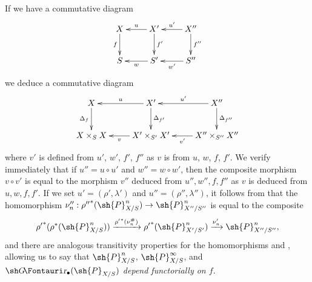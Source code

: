 \begin{env}[16.4.2]
\label{IV.16.4.2}
If we have a commutative diagram
\[
  \xymatrix{
    X \ar[d]_-{f} & X' \ar[l]_-u \ar[d]^-{f'} & X'' \ar[l]_-{u'} \ar[d]^-{f''}\\
    S & S' \ar[l]^-w & S'' \ar[l]^-{w'} 
  }
\]
we deduce a commutative diagram
\[
  \xymatrix{
    X \ar[d]_-{\Delta_f} & X' \ar[l]_-u \ar[d]^-{\Delta_{f'}} & X'' \ar[l]_-{u'} \ar[d]^-{\Delta_{f''}}\\
    X \times_S X & X' \times_{S'} X' \ar[l]^-v & X'' \times_{S''} X'' \ar[l]^-{v'}
  }
\]
where $v'$ is defined from $u'$, $w'$, $f'$, $f''$ as $v$ is from $u$, $w$, $f$, $f'$.
We verify immediately that if $u''=u\circ u'$ and $w''=w\circ w'$, then the composite morphism $v\circ v'$ is equal to the morphism $v''$ deduced from $u'',w'',f,f''$ as $v$ is deduced from $u,w,f,f'$.
If we set $u'=(\rho',\lambda')$ and $u''=(\rho'',\lambda'')$, it follows from  that the homomorphism $\nu''_n:{\rho''}^*(\sh{P}_{X/S}^n)\to\sh{P}_{X''/S''}^n$ is equal to the composite
\[
  {\rho'}^*(\rho^*(\sh{P}_{X/S}^n)) \xrightarrow{{\rho'}^*(\nu_n^\#)} {\rho'}^*(\sh{P}_{X'/S'}^n) \xrightarrow{\nu'_n} \sh{P}_{X''/S''}^n,
\]
and there are analogous transitivity properties for the homomorphisms  and , allowing us to say that $\sh{P}_{X/S}^n$, $\sh{P}_{X/S}^\infty$, and $\shGr_\bullet(\sh{P}_{X/S})$ \emph{depend functorially on $f$}.
\end{env}

